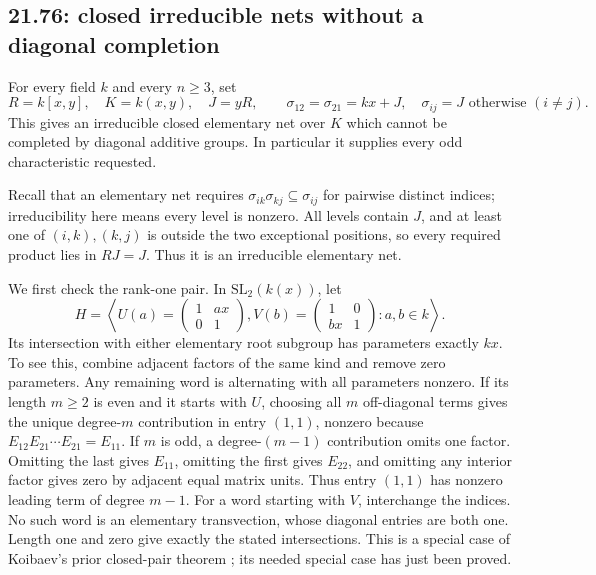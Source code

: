 \subsection{21.76: closed irreducible nets without a diagonal completion}
\label{cand:21.76}
For every field \(k\) and every \(n\ge3\), set
\[
 R=k[x,y],\quad K=k(x,y),\quad J=yR,\qquad
 \sigma_{12}=\sigma_{21}=kx+J,\quad
 \sigma_{ij}=J\text{ otherwise }(i\ne j).
\]
This gives an irreducible closed elementary net over \(K\) which
cannot be completed by diagonal additive groups.
In particular it supplies every odd characteristic requested.

Recall that an elementary net requires
\(\sigma_{ik}\sigma_{kj}\subseteq\sigma_{ij}\) for pairwise distinct
indices; irreducibility here means every level is nonzero.
All levels contain \(J\), and at least one of \((i,k),(k,j)\)
is outside the two exceptional positions, so every required product
lies in \(RJ=J\). Thus it is an irreducible elementary net.

We first check the rank-one pair. In \(\mathrm{SL}_2(k(x))\), let
\[
 H=\left\langle
 U(a)=\begin{pmatrix}1&ax\\0&1\end{pmatrix},
 V(b)=\begin{pmatrix}1&0\\bx&1\end{pmatrix}:a,b\in k
 \right\rangle.
\]
Its intersection with either elementary root subgroup has parameters
exactly \(kx\).
To see this, combine adjacent factors of the same kind and remove
zero parameters. Any remaining word is alternating with all
parameters nonzero. If its length \(m\ge2\) is even and it starts
with \(U\), choosing all \(m\) off-diagonal terms gives the unique
degree-\(m\) contribution in entry \((1,1)\), nonzero because
\(E_{12}E_{21}\cdots E_{21}=E_{11}\).
If \(m\) is odd, a degree-\((m-1)\) contribution omits one factor.
Omitting the last gives \(E_{11}\), omitting the first gives
\(E_{22}\), and omitting any interior factor gives zero by adjacent
equal matrix units. Thus entry \((1,1)\) has nonzero leading term
of degree \(m-1\). For a word starting with \(V\), interchange the
indices. No such word is an elementary transvection, whose diagonal
entries are both one. Length one and zero give exactly the stated
intersections.
This is a special case of Koibaev's prior closed-pair theorem
\cite{koibaev-closed-pairs}; its needed special case has just been proved.

